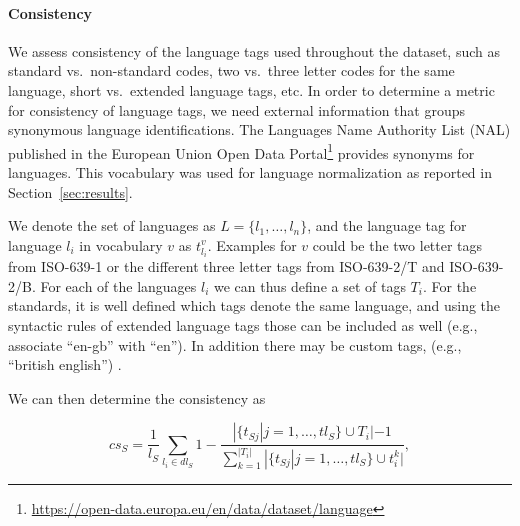
\paragraph{Consistency}

We assess consistency of the language tags used throughout the dataset, such as standard vs.\ non-standard codes, two vs.\ three letter codes for the same language, short vs.\ extended language tags, etc. In order to determine a metric for consistency of language tags, we need external information that groups synonymous language identifications. The Languages Name Authority List (NAL) published in the European Union Open Data Portal\footnote{\url{https://open-data.europa.eu/en/data/dataset/language}} provides synonyms for languages. This vocabulary was used for language normalization as reported in Section~\ref{sec:results}.

We denote the set of languages as $L=\{l_1, \ldots, l_n\}$, and the language tag for language $l_i$ in vocabulary $v$ as $t_{l_i}^v$. Examples for $v$ could be the two letter tags from ISO-639-1 or the different three letter tags from ISO-639-2/T and ISO-639-2/B. For each of the languages $l_i$ we can thus define a set of tags $T_i$.
For the standards, it is well defined which tags denote the same language, and using the syntactic rules of extended language tags those can be included as well (e.g., associate ``en-gb'' with ``en''). In addition there may be custom tags, (e.g., ``british english'') .

We can then determine the consistency as

\begin{equation}
cs_S = \frac{1}{l_S} \sum_{l_i \in dl_S} 1 - \frac{|\{t_{Sj}| j=1, \ldots, tl_S \} \cup T_i| -1}{\sum_{k=1}^{|T_i|} |\{t_{Sj}| j=1, \ldots, tl_S \} \cup {t^k_i}| },
\end{equation}

